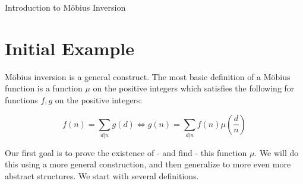 \documentclass[12pt]{pom_thesis}
\begin{document}
\newpage
{}
\begin{chapter}{Introduction to M\"obius Inversion}\label{chap_intro}
\section{Initial Example}
M\"obius inversion is a general construct. The most basic definition of a M\"obius function is a function $\mu$ on the positive integers which satisfies the following for functions $f,g$ on the positive integers:

\begin{equation}\label{init_mob} %
f(n) = \sum_{d | n} g(d) \iff g(n) = \sum_{d | n}  f(n)\mu\left(\frac dn\right)
\end{equation}

Our first goal is to prove the existence of - and find - this function $\mu$. We will do this using a more general construction, and then generalize to more even more abstract structures. We start with several definitions.

\end{chapter}
\end{document}
